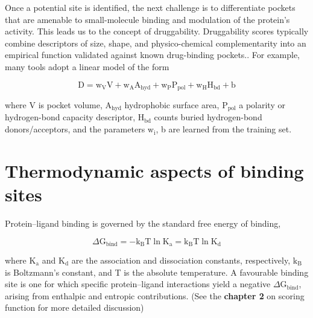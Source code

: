 \documentclass[12pt]{article}
\begin{document}
Once a potential site is identified, the next challenge is to differentiate pockets that are amenable to small-molecule binding and modulation of the protein's activity. This leads us to the concept of druggability. Druggability scores typically combine descriptors of size, shape, and physico-chemical complementarity into an empirical function validated against known drug-binding pockets.\cite{CH5_Halgren2009,CH5_LeGuilloux2009}. For example, many tools adopt a linear model of the form

\begin{equation}
\textrm{D} = \textrm{w}_\textrm{V} \textrm{V} + \textrm{w}_\textrm{A}  \textrm{A}_{\textrm{hyd}} + \textrm{w}_\textrm{P}  \textrm{P}_{\textrm{pol}} + \textrm{w}_\textrm{H} \textrm{H}_{\textrm{bd}} + \textrm{b}
\label{eq:druggability}
\end{equation}

where V is pocket volume, $\textrm{A}_{\textrm{hyd}}$ hydrophobic surface area, $\textrm{P}_{\textrm{pol}}$ a polarity or hydrogen-bond capacity descriptor, $\textrm{H}_{\textrm{bd}}$ counts buried hydrogen-bond donors/acceptors, and the parameters $\textrm{w}_\textrm{i}$, b are learned from the training set.

\section{Thermodynamic aspects of binding sites}

Protein--ligand binding is governed by the standard free energy of binding,

\begin{equation}
\Delta \textrm{G}_{\textrm{bind}} = -\textrm{k}_{\textrm{B}} \textrm{T} \ln \textrm{K}_{\textrm{a}} = \textrm{k}_{\textrm{B}} \textrm{T} \ln \textrm{K}_{\textrm{d}}
\label{eq:dg_bind}
\end{equation}

where $\textrm{K}_\textrm{a}$ and $\textrm{K}_\textrm{d}$ are the association and dissociation constants, respectively, $\textrm{k}_\textrm{B}$ is Boltzmann's constant, and T is the absolute temperature. A favourable binding site is one for which specific protein--ligand interactions yield a negative $\Delta \textrm{G}_{\textrm{bind}}$, arising from enthalpic and entropic contributions. (See the \textbf{chapter 2} on scoring function for more detailed discussion)
\end{document}
